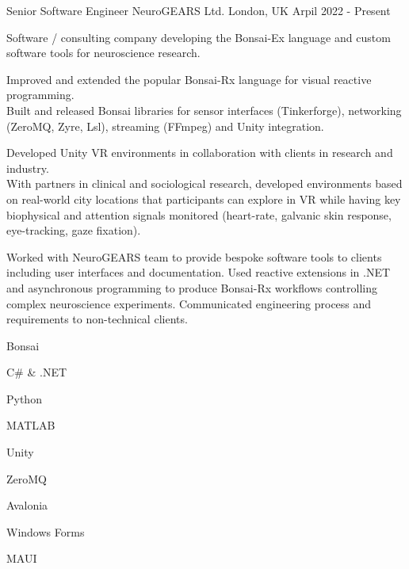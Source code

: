 

\begin{cventries}

  \cventry%
    {Senior Software Engineer} %
    {NeuroGEARS Ltd.} %
    {London, UK} %
    {Arpil 2022 \-- Present} %
    {
      \begin{cvsentence}Software / consulting company developing the Bonsai-Ex language and custom software tools for neuroscience research.\end{cvsentence}
      \begin{cvitems} %
        \item {Improved and extended the popular Bonsai-Rx language for visual reactive programming.} \\
        Built and released Bonsai libraries for sensor interfaces (Tinkerforge), networking (ZeroMQ, Zyre, Lsl), streaming (FFmpeg) and Unity integration.
        \item {Developed Unity VR environments in collaboration with clients in research and industry.} \\
        With partners in clinical and sociological research, developed environments based on real-world city locations that participants can explore in VR while having key biophysical and attention signals monitored (heart-rate, galvanic skin response, eye-tracking, gaze fixation).
        \item {Worked with NeuroGEARS team to provide bespoke software tools to clients including user interfaces and documentation. Used reactive extensions in .NET and asynchronous programming to produce Bonsai-Rx workflows controlling complex neuroscience experiments. Communicated engineering process and requirements to non-technical clients.}
      \end{cvitems}
    }
    \begin{cventryskills}
      \item Bonsai
      \item C\# \& .NET
      \item Python
      \item MATLAB
      \item Unity
      \item ZeroMQ
      \item Avalonia
      \item Windows Forms
      \item MAUI
    \end{cventryskills}


\end{cventries}

